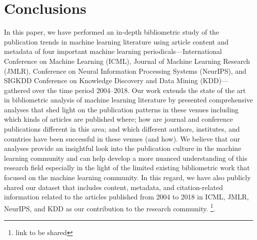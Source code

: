 \clearpage
\section{Conclusions}
\label{sec:conclusion}

In this paper, we have performed an in-depth bibliometric study of the publication trends in machine learning literature using article content and metadata of four important machine learning periodicals---International Conference on Machine Learning (ICML), Journal of Machine Learning Research (JMLR), Conference on Neural Information Processing Systems (NeurIPS), and SIGKDD Conference on Knowledge Discovery and Data Mining (KDD)---gathered over the time period 2004--2018.  Our work extends the state of the art in bibliometric analysis of machine learning literature by presented comprehensive analyses that shed light on the publication patterns in these venues including which kinds of articles are published where; how are journal and conference publications different in this area; and which different authors, institutes, and countries have been successful in these venues (and how). We believe that our analyses provide an insightful look into the publication culture in the machine learning community and can help develop a more nuanced understanding of this research field especially in the light of the limited existing bibliometric work that focused on the machine learning community. In this regard, we have also publicly shared our dataset that includes content, metadata, and citation-related information related to the articles published from 2004 to 2018 in ICML, JMLR, NeurIPS, and KDD as our contribution to the research community. \footnote{link to be shared}.
